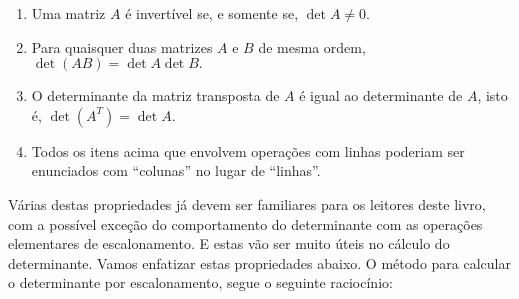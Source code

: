 \begin{teo}
\begin{enumerate}[$(i)$]
\item Uma matriz $A$ é invertível se, e somente se, $\det A \neq 0.$

\item Para quaisquer duas matrizes $A$ e $B$ de mesma ordem, $\det (AB) = \det A \det B.$

\item O determinante da matriz transposta de $A$ é igual ao determinante de $A$, isto é, $\det (A^T) = \det A.$

\item Todos os itens acima que envolvem operações com linhas poderiam ser enunciados com ``colunas'' no lugar de ``linhas''.
\end{enumerate}
\end{teo}

Várias destas propriedades já devem ser familiares para os leitores deste livro, com a possível exceção do comportamento do determinante com as operações elementares de escalonamento. E estas vão ser muito úteis no cálculo do determinante. Vamos enfatizar estas propriedades abaixo. O método para calcular o determinante por escalonamento, segue o seguinte raciocínio:
